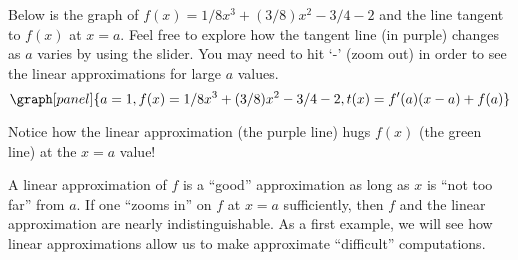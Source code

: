 \documentclass[handout,nooutcomes]{ximera}
\begin{document}
\begin{example}
\begin{example}
Below is the graph of $f(x) = 1/8x^3 + (3/8)x^2 -3/4 - 2$ and the line
tangent to $f(x)$ at $x=a$. Feel free to explore how the tangent line
(in purple) changes as $a$ varies by using the slider. You may need to
hit `-' (zoom out) in order to see the linear approximations for large $a$ values.
\[
\graph[panel]{a=1, f(x) = 1/8x^3 + (3/8)x^2 -3/4 - 2, t(x) = f'(a)(x-a)+ f(a)}
\]

Notice how the linear approximation (the purple line) hugs
$f(x)$ (the green line) at the $x=a$ value!
\end{example}

A linear approximation of $f$ is a ``good'' approximation as long as
$x$ is ``not too far'' from $a$.
If one ``zooms in'' on $f$ at $x=a$ sufficiently, then $f$ and the linear
approximation are nearly indistinguishable. As a first example, we
will see how linear approximations allow us to make approximate
``difficult'' computations.
\end{example}
\end{document}

